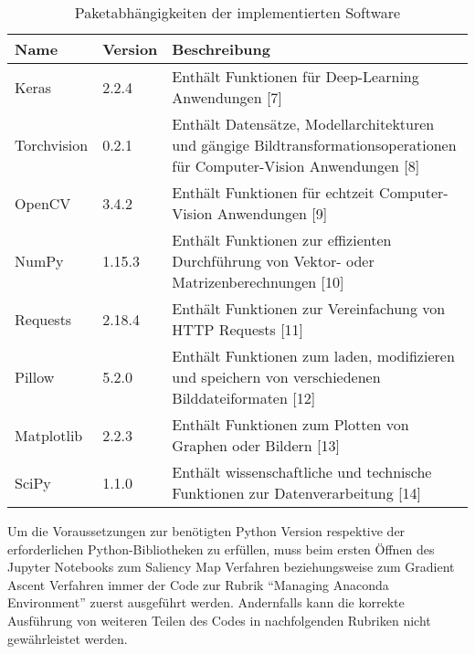 \begin{table}
	\centering
\begin{tabular}{|l|l|p{10.4cm}|}
	\hline 
	Name & Version & Beschreibung \\ 
	\hline\hline 
	Keras& 2.2.4  & Enthält Funktionen für Deep-Learning Anwendungen [7] \\ 
	\hline 
	Torchvision& 0.2.1 & Enthält Datensätze, Modellarchitekturen und gängige Bildtransformationsoperationen für Computer-Vision Anwendungen [8] \\ 
	\hline 
	OpenCV& 3.4.2  & Enthält Funktionen für echtzeit Computer-Vision Anwendungen [9] \\ 
	\hline 
	NumPy&  1.15.3& Enthält Funktionen zur effizienten Durchführung von Vektor- oder Matrizenberechnungen [10] \\ 
	\hline 
	Requests& 2.18.4 & Enthält Funktionen zur Vereinfachung von HTTP Requests [11] \\ 
	\hline 
	Pillow& 5.2.0 & Enthält Funktionen zum laden, modifizieren und speichern von verschiedenen Bilddateiformaten [12] \\ 
	\hline 
	Matplotlib& 2.2.3 & Enthält Funktionen zum Plotten von Graphen oder Bildern [13] \\ 
	\hline 
	SciPy& 1.1.0  & Enthält wissenschaftliche und technische Funktionen zur Datenverarbeitung [14] \\ 
	\hline 
\end{tabular} 
	\caption{Paketabhängigkeiten der implementierten Software}
\label{tab:parameter}
\end{table}

Um die Voraussetzungen zur benötigten Python Version respektive der erforderlichen Python-Bibliotheken zu erfüllen, muss beim ersten Öffnen des Jupyter Notebooks zum Saliency Map Verfahren beziehungsweise zum Gradient Ascent Verfahren immer der Code zur Rubrik “Managing Anaconda Environment” zuerst ausgeführt werden. Andernfalls kann die korrekte Ausführung von weiteren Teilen des Codes in nachfolgenden Rubriken nicht gewährleistet werden.